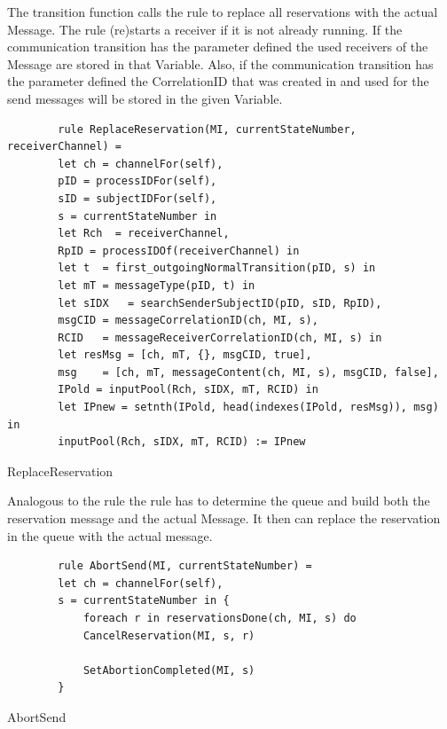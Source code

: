 The transition function calls the  rule to replace all
reservations with the actual Message. The  rule
(re)starts a receiver if it is not already running.
If the communication transition has the parameter  defined
the used receivers of the Message are stored in that Variable.
Also, if the communication transition has the parameter  defined
the CorrelationID that was created in  and used for the send messages will be stored in the given Variable.


\begin{listing}[H]
	\begin{verbatim}
		rule ReplaceReservation(MI, currentStateNumber, receiverChannel) =
		let ch = channelFor(self),
		pID = processIDFor(self),
		sID = subjectIDFor(self),
		s = currentStateNumber in
		let Rch  = receiverChannel,
		RpID = processIDOf(receiverChannel) in
		let t  = first_outgoingNormalTransition(pID, s) in
		let mT = messageType(pID, t) in
		let sIDX   = searchSenderSubjectID(pID, sID, RpID),
		msgCID = messageCorrelationID(ch, MI, s),
		RCID   = messageReceiverCorrelationID(ch, MI, s) in
		let resMsg = [ch, mT, {}, msgCID, true],
		msg    = [ch, mT, messageContent(ch, MI, s), msgCID, false],
		IPold = inputPool(Rch, sIDX, mT, RCID) in
		let IPnew = setnth(IPold, head(indexes(IPold, resMsg)), msg) in
		inputPool(Rch, sIDX, mT, RCID) := IPnew
	\end{verbatim}
	\caption{ReplaceReservation}
	\label{lst:shortasm:ReplaceReservation}
\end{listing}


Analogous to the  rule the
 rule has to determine the queue and build both
the reservation message and the actual Message. It then can replace the reservation
in the queue with the actual message.


\begin{listing}[H]
	\begin{verbatim}
		rule AbortSend(MI, currentStateNumber) =
		let ch = channelFor(self),
		s = currentStateNumber in {
			foreach r in reservationsDone(ch, MI, s) do
			CancelReservation(MI, s, r)
			
			SetAbortionCompleted(MI, s)
		}
	\end{verbatim}
	\caption{AbortSend}
	\label{lst:shortasm:AbortSend}
\end{listing}


